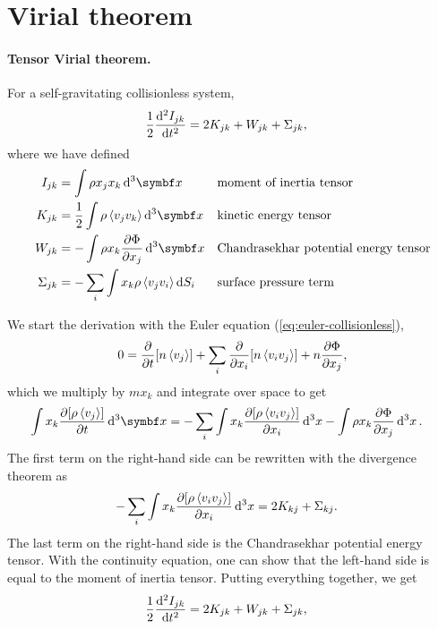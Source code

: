 \section{Virial theorem}

\paragraph*{Tensor Virial theorem.}
For a self-gravitating collisionless system,
\begin{align*}
	\frac{1}{2}
	\dv[2]{I_{jk}}{t}
	&= 2 K_{jk} + W_{jk} + \Sigma_{jk},
\end{align*}
where we have defined
\begin{align*}
	I_{jk}
	&= \int \rho x_j x_k \dd{^3 \vec{x}}
	&&\text{moment of inertia tensor}\\
	K_{jk}
	&= \frac{1}{2} \int \rho \avg{v_j v_k} \dd{^3 \vec{x}}
	&&\text{kinetic energy tensor}\\
	W_{jk}
	&= - \int \rho x_k \pdv{\Phi}{x_j} \dd{^3 \vec{x}}
	&&\text{Chandrasekhar potential energy tensor}\\
	\Sigma_{jk}
	&= - \sum_i \int x_k \rho \avg{v_j v_i} \dd{S_i}
	&&\text{surface pressure term}
\end{align*}

We start the derivation with the Euler equation (\ref{eq:euler-collisionless}),
\begin{align*}
	0
	&= \pdv{}{t} [n \left\langle v_j \right\rangle]
	+ \sum_{i} \pdv{}{x_i} [n \left\langle v_i v_j \right\rangle]
	+ n \pdv{\Phi}{x_j},\\
\end{align*}
which we multiply by $m x_k$ and integrate over space to get
\begin{align*}
	\int x_k \pdv{[\rho\avg{v_j}]}{t} \dd{^3 \vec{x}}
	&= - \sum_i \int x_k \pdv{[\rho \avg{v_i v_j}]}{x_i} \dd{^3 x}
	- \int  \rho x_k \pdv{\Phi}{x_j} \dd{^3 x}.
\end{align*}
The first term on the right-hand side can be rewritten with the divergence theorem as
\begin{align*}
	- \sum_i \int x_k \pdv{[\rho \left\langle v_i v_j \right\rangle]}{x_i} \dd{^3 x}
	&= 2 K_{kj} + \Sigma_{kj}.
\end{align*}
The last term on the right-hand side is the Chandrasekhar potential energy tensor. With the continuity equation, one can show that the left-hand side is equal to the moment of inertia tensor. Putting everything together, we get
\begin{align*}
	\frac{1}{2}
	\dv[2]{I_{jk}}{t}
	&= 2 K_{jk} + W_{jk} + \Sigma_{jk},
\end{align*}



